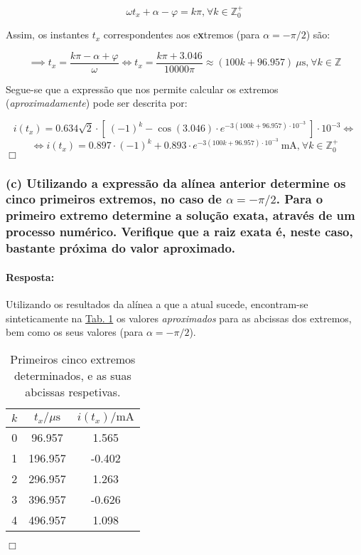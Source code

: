 $$
    \omega t_x + \alpha -\varphi = k\pi\text{,}\ \forall k \in \mathbb{Z}_{0}^{+}
$$

Assim, os instantes $t_x$ correspondentes aos e\textbf{x}tremos (para $\alpha = -\pi/2$) são:

$$
    \implies t_x = \frac{k\pi - \alpha + \varphi}{\omega} \iff t_x = \frac{k\pi + 3.046}{10000\pi} \approx (100k + 96.957)\ \mu\text{s}\text{,}\ \forall k \in \mathbb{Z} 
$$

Segue-se que a expressão que nos permite calcular os extremos (\textit{aproximadamente}) pode ser descrita por:

$$
    i(t_x) = 0.634\sqrt{2}\cdot [\ (-1)^k - \cos{(3.046)}\cdot e^{-3(100k + 96.957)\cdot 10^{-3}} \ ]\cdot 10^{-3} \iff
$$
$$
\iff i(t_x) = 0.897\cdot (-1)^k + 0.893\cdot e^{-3(100k + 96.957)\cdot 10^{-3}}\ \text{mA}\text{,}\ \forall k \in \mathbb{Z}_{0}^{+}
$$
\hfill \ensuremath{\Box}

\clearpage
\subsubsection*{(c) Utilizando a expressão da alínea anterior determine os cinco primeiros extremos, no caso de $\alpha = -\pi/2$. Para o primeiro extremo determine a solução exata, através de um processo
numérico. Verifique que a raiz exata é, neste caso, bastante próxima do valor aproximado.}
\label{subsubsec_c}
\paragraph{Resposta:}
Utilizando os resultados da alínea a que a atual sucede, encontram-se sinteticamente na \hyperref[tab1]{Tab. 1} os valores \textit{aproximados} para as abcissas dos extremos, bem como os seus valores (para $\alpha = -\pi/2$).

\begin{table}[ht]
    \centering
    \caption{Primeiros cinco extremos determinados, e as suas abcissas respetivas.}
    \label{tab1}
    \begin{tabular}{SSS}
        \toprule
        $k$ & $t_x/\mu\text{s}$ & $i(t_x)/\text{mA}$ \\   & 96.957 & 1.565  \\
        1  & 196.957 & -0.402 \\
        2  & 296.957 & 1.263 \\
        3  & 396.957 & -0.626 \\
        4  &  496.957 & 1.098 \\ \bottomrule
    \end{tabular}
\end{table}
\hfill \ensuremath{\Box}

